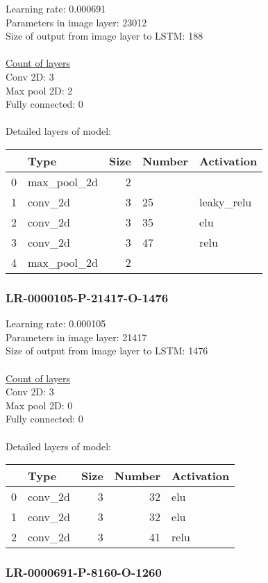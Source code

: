 Learning rate: 0.000691
\\Parameters in image layer: 23012
\\Size of output from image layer to LSTM: 188
\\\\\underline{Count of layers} 
\\Conv 2D:           3\\Max pool 2D:      2\\Fully connected:  0
\\\\Detailed layers of model: \\\begin{tabular}{rlrll}
\hline
    & Type        &   Size & Number   & Activation   \\
\hline
  0 & max\_pool\_2d &      2 &          &              \\
  1 & conv\_2d     &      3 & 25       & leaky\_relu   \\
  2 & conv\_2d     &      3 & 35       & elu          \\
  3 & conv\_2d     &      3 & 47       & relu         \\
  4 & max\_pool\_2d &      2 &          &              \\
\hline
\end{tabular}\subsubsection*{LR-0000105-P-21417-O-1476}
Learning rate: 0.000105
\\Parameters in image layer: 21417
\\Size of output from image layer to LSTM: 1476
\\\\\underline{Count of layers} 
\\Conv 2D:           3\\Max pool 2D:      0\\Fully connected:  0
\\\\Detailed layers of model: \\\begin{tabular}{rlrrl}
\hline
    & Type    &   Size &   Number & Activation   \\
\hline
  0 & conv\_2d &      3 &       32 & elu          \\
  1 & conv\_2d &      3 &       32 & elu          \\
  2 & conv\_2d &      3 &       41 & relu         \\
\hline
\end{tabular}\subsubsection*{LR-0000691-P-8160-O-1260}
